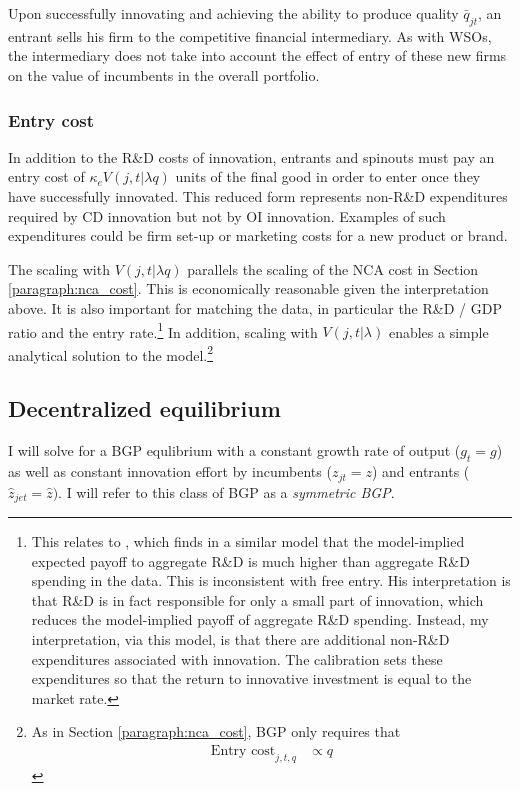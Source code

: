 \documentclass[11pt,english]{article}
\begin{document}
Upon successfully innovating and achieving the ability to produce quality $\bar{q}_{jt}$, an entrant sells his firm to the competitive financial intermediary. As with WSOs, the intermediary does not take into account the effect of entry of these new firms on the value of incumbents in the overall portfolio.

\subsubsection{Entry cost}

In addition to the R\&D costs of innovation, entrants and spinouts must pay an entry cost of $\kappa_{e} V(j,t|\lambda q)$ units of the final good in order to enter once they have successfully innovated. This reduced form represents non-R\&D expenditures required by CD innovation but not by OI innovation. Examples of such expenditures could be firm set-up or marketing costs for a new product or brand.

The scaling with $V(j,t|\lambda q)$ parallels the scaling of the NCA cost in Section \ref{paragraph:nca_cost}. This is economically reasonable given the interpretation above. It is also important for matching the data, in particular the R\&D / GDP ratio and the entry rate.\footnote{This relates to \cite{comin_rd_2004}, which finds in a similar model that the model-implied expected payoff to aggregate R\&D is much higher than aggregate R\&D spending in the data. This is inconsistent with free entry. His interpretation is that R\&D is in fact responsible for only a small part of innovation, which reduces the model-implied payoff of aggregate R\&D spending. Instead, my interpretation, via this model, is that there are additional non-R\&D expenditures associated with innovation. The calibration sets these expenditures so that the return to innovative investment is equal to the market rate.} In addition, scaling with $V(j,t|\lambda)$ enables a simple analytical solution to the model.\footnote{As in Section \ref{paragraph:nca_cost}, BGP only requires that 
\begin{align*}
	\textrm{Entry cost}_{j,t,q} &\propto q
\end{align*}}

\subsection{Decentralized equilibrium}\label{subsec:decentralized_equilibrium}

I will solve for a BGP equlibrium with a constant growth rate of output ($g_t = g$) as well as constant innovation effort by incumbents ($z_{jt} = z$) and entrants ($\hat{z}_{jet} = \hat{z})$. I will refer to this class of BGP as a \textit{symmetric BGP}.
\end{document}
